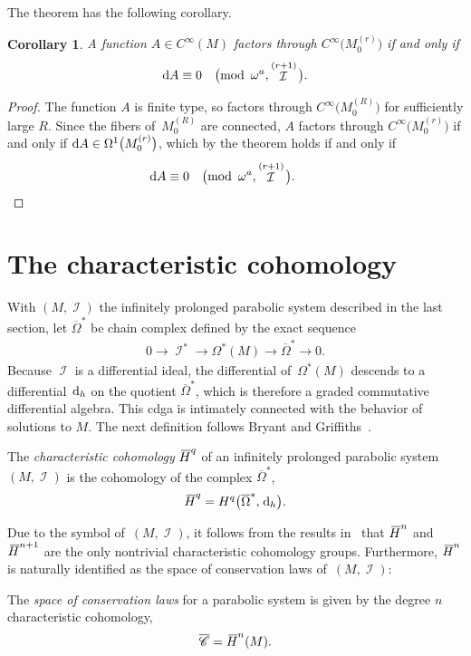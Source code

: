 \documentclass[pdftex]{sigma}
\DeclareMathOperator{\I}{\mathcal{I}}
\renewcommand{\d}{{\rm d}}
\newcommand{\cinfinity}[1]{C^\infty\big(#1\big)}
\renewcommand{\mod}[1]{\quad\big(\mathrm{mod\enspace} #1\big)}
\newcommand{\M}[1]{M_0^{(#1)}}
\renewcommand{\dh}{\ensuremath{\hspace{1pt} \d_h}}
\newcommand{\barh}[1]{{}\mkern3mu\overline{\mkern-3mu H}^{#1}}
\newcommand{\cMinfty}{C^\infty(M)}
\newcommand{\Omegabar}{\overline{\Omega}}
\numberwithin{equation}{section}
\newtheorem{Corollary}[Theorem]{Corollary}
\begin{document}
The theorem has the following corollary.
\begin{Corollary}\label{cor: factoring through}
 A function $A \in \cMinfty$ factors through $\cinfinity{\M{r}}$ if and only if
 \begin{gather*}
 \d A \equiv 0 \mod{\omega^a, \I^{(r+1)}} .
 \end{gather*}
\end{Corollary}
\begin{proof}
 The function $A$ is finite type, so factors through $\cinfinity{\M{R}}$ for sufficiently large $R$. Since the fibers of~$\M{R}$ are connected, $A$ factors through $\cinfinity{\M{r}}$ if and only if $\d A \in \Omega^1\big(\M{r}\big)$, which by the theorem holds if and only if
 \begin{gather*}
 \d A \equiv 0 \mod{\omega^a, \I^{(r+1)}} .
 \tag*{\qed}
\end{gather*}
\renewcommand{\qed}{}
\end{proof}


\section{The characteristic cohomology}\label{sec:characteristic cohomology}

With $(M, \I)$ the infinitely prolonged parabolic system described in the last section, let $\Omegabar^*$ be chain complex defined by the exact sequence
\begin{gather*}
0 \xrightarrow{\quad} \I^* \xrightarrow{\quad} \Omega^*(M) \xrightarrow{\quad} \Omegabar^* \xrightarrow{\quad} 0 .
\end{gather*}
Because $\I$ is a differential ideal, the differential of~$\Omega^*(M)$ descends to a differential $\dh$ on the quotient $\Omegabar^*$, which is therefore a graded commutative differential algebra.
This cdga is intimately connected with the behavior of solutions to $M$. The next definition follows Bryant and Griffiths~\cite{Characteristic_Cohomology_I}.
\begin{Definition}
 The \emph{characteristic cohomology} $\barh{q}$ of an infinitely prolonged parabolic sys\-tem~$(M,\I)$ is the cohomology of the complex $\Omegabar^*$,
 \begin{gather*}
 \barh{q} = H^q\big(\Omegabar^*,\dh\big) .
 \end{gather*}
\end{Definition}
Due to the symbol of~$(M,\I)$, it follows from the results in~\cite{Characteristic_Cohomology_I} that $\barh{n}$ and $\barh{n+1}$ are the only nontrivial characteristic cohomology groups. Furthermore,
$\barh{n}$ is naturally identified as the space of conservation laws of~$(M,\I)$:
\begin{Definition}
 The \emph{space of conservation laws} for a parabolic system is given by the degree $n$ characteristic cohomology,
 \begin{gather*}
 \overline{\mathscr{C}} = \barh{n}(M) .
 \end{gather*}
\end{Definition}
\end{document}
